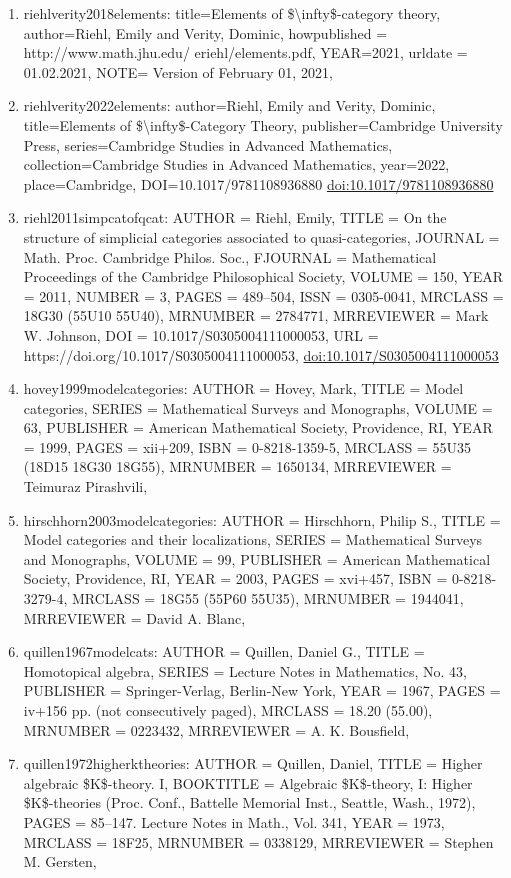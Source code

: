 \documentclass[11pt]{article}
\begin{document}
\begin{enumerate}[leftmargin=*]
  \item riehlverity2018elements: title=Elements of \$\textbackslash{}infty\$-category theory, author=Riehl, Emily and Verity, Dominic, howpublished = http://www.math.jhu.edu/ eriehl/elements.pdf, YEAR=2021, urldate = 01.02.2021, NOTE= Version of February 01, 2021,
  \item riehlverity2022elements: author=Riehl, Emily and Verity, Dominic, title=Elements of \$\textbackslash{}infty\$-Category Theory, publisher=Cambridge University Press, series=Cambridge Studies in Advanced Mathematics, collection=Cambridge Studies in Advanced Mathematics, year=2022, place=Cambridge, DOI=10.1017/9781108936880 \href{https://doi.org/10.1017/9781108936880}{doi:10.1017/9781108936880}
  \item riehl2011simpcatofqcat: AUTHOR = Riehl, Emily, TITLE = On the structure of simplicial categories associated to quasi-categories, JOURNAL = Math. Proc. Cambridge Philos. Soc., FJOURNAL = Mathematical Proceedings of the Cambridge Philosophical Society, VOLUME = 150, YEAR = 2011, NUMBER = 3, PAGES = 489--504, ISSN = 0305-0041, MRCLASS = 18G30 (55U10 55U40), MRNUMBER = 2784771, MRREVIEWER = Mark W. Johnson, DOI = 10.1017/S0305004111000053, URL = https://doi.org/10.1017/S0305004111000053, \href{https://doi.org/10.1017/S0305004111000053}{doi:10.1017/S0305004111000053}
  \item hovey1999modelcategories: AUTHOR = Hovey, Mark, TITLE = Model categories, SERIES = Mathematical Surveys and Monographs, VOLUME = 63, PUBLISHER = American Mathematical Society, Providence, RI, YEAR = 1999, PAGES = xii+209, ISBN = 0-8218-1359-5, MRCLASS = 55U35 (18D15 18G30 18G55), MRNUMBER = 1650134, MRREVIEWER = Teimuraz Pirashvili,
  \item hirschhorn2003modelcategories: AUTHOR = Hirschhorn, Philip S., TITLE = Model categories and their localizations, SERIES = Mathematical Surveys and Monographs, VOLUME = 99, PUBLISHER = American Mathematical Society, Providence, RI, YEAR = 2003, PAGES = xvi+457, ISBN = 0-8218-3279-4, MRCLASS = 18G55 (55P60 55U35), MRNUMBER = 1944041, MRREVIEWER = David A. Blanc,
  \item quillen1967modelcats: AUTHOR = Quillen, Daniel G., TITLE = Homotopical algebra, SERIES = Lecture Notes in Mathematics, No. 43, PUBLISHER = Springer-Verlag, Berlin-New York, YEAR = 1967, PAGES = iv+156 pp. (not consecutively paged), MRCLASS = 18.20 (55.00), MRNUMBER = 0223432, MRREVIEWER = A. K. Bousfield,
  \item quillen1972higherktheories: AUTHOR = Quillen, Daniel, TITLE = Higher algebraic \$K\$-theory. I, BOOKTITLE = Algebraic \$K\$-theory, I: Higher \$K\$-theories (Proc. Conf., Battelle Memorial Inst., Seattle, Wash., 1972), PAGES = 85--147. Lecture Notes in Math., Vol. 341, YEAR = 1973, MRCLASS = 18F25, MRNUMBER = 0338129, MRREVIEWER = Stephen M. Gersten,

\end{enumerate}
\end{document}
